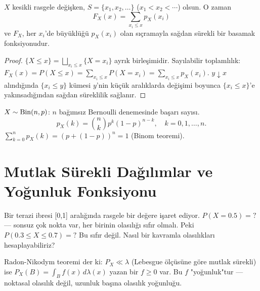 \begin{teorem}
\label{thm:pmf_kdf}
$X$ kesikli rasgele değişken, $S = \{x_1, x_2, \ldots\}$ ($x_1 < x_2 < \cdots$) olsun. O zaman
\[
  F_X(x) = \sum_{x_i \leq x} p_X(x_i)
\]
ve $F_X$, her $x_i$'de büyüklüğü $p_X(x_i)$ olan sıçramayla
sağdan sürekli bir basamak fonksiyonudur.
\end{teorem}

\begin{proof}
$\{X \leq x\} = \bigsqcup_{x_i \leq x} \{X = x_i\}$ ayrık birleşimidir.
Sayılabilir toplamlılık:
$F_X(x) = P(X \leq x) = \sum_{x_i \leq x} P(X = x_i) = \sum_{x_i \leq x} p_X(x_i)$.
$y \downarrow x$ alındığında $\{x_i \leq y\}$ kümesi $y$'nin küçük aralıklarda
değişimi boyunca $\{x_i \leq x\}$'e yakınsadığından sağdan süreklilik sağlanır.
\end{proof}

\begin{ornek}[Binom]
\label{ex:binom_pmf}
$X \sim \operatorname{Bin}(n, p)$: $n$ bağımsız Bernoulli denemesinde başarı sayısı.
\[
  p_X(k) = \binom{n}{k} p^k (1-p)^{n-k}, \quad k = 0, 1, \ldots, n.
\]
$\sum_{k=0}^n p_X(k) = (p + (1-p))^n = 1$ (Binom teoremi).
\end{ornek}

\section{Mutlak Sürekli Dağılımlar ve Yoğunluk Fonksiyonu}
\label{sec:surekli}

\begin{kesif}
Bir terazi ibresi [0,1] aralığında rasgele bir değere işaret ediyor.
$P(X = 0.5) = ?$ --- sonsuz çok nokta var, her birinin olasılığı sıfır olmalı.
Peki $P(0.3 \leq X \leq 0.7) = ?$ Bu sıfır değil.
Nasıl bir kavramla olasılıkları hesaplayabiliriz?
\end{kesif}

\begin{tanimgerekce}
Radon-Nikodym teoremi der ki: $P_X \ll \lambda$ (Lebesgue ölçüsüne göre
mutlak sürekli) ise $P_X(B) = \int_B f(x) \, d\lambda(x)$ yazan bir $f \geq 0$ var.
Bu $f$ "yoğunluk"tur --- noktasal olasılık değil, uzunluk başına olasılık yoğunluğu.
\end{tanimgerekce}

